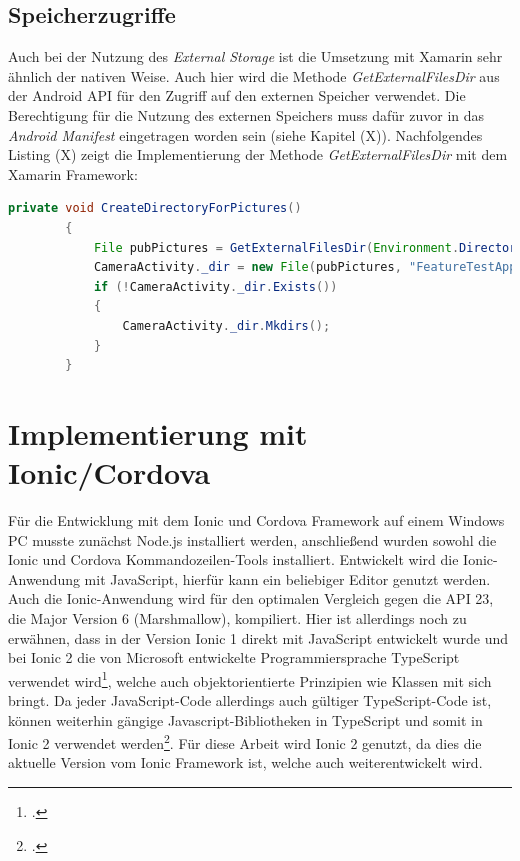 \subsection{Speicherzugriffe}

Auch bei der Nutzung des \textit{External Storage} ist die Umsetzung mit Xamarin sehr ähnlich der nativen Weise. Auch hier wird die Methode \textit{GetExternalFilesDir} aus der Android API für den Zugriff auf den externen Speicher verwendet. Die Berechtigung für die Nutzung des externen Speichers muss dafür zuvor in das \textit{Android Manifest} eingetragen worden sein (siehe Kapitel (X)). Nachfolgendes Listing (X) zeigt die Implementierung der Methode \textit{GetExternalFilesDir} mit dem Xamarin Framework:

\begin{lstlisting}[caption=Methode \textit{GetExternalFilesDir()}: Adressieren des 'External Storage' und Anlegen eines Ordners für die Fotos der Funktionstest-Anwendung, label=lst:SpeicherzugriffXamarin, language=Java]
private void CreateDirectoryForPictures()
        {
            File pubPictures = GetExternalFilesDir(Environment.DirectoryPictures);
            CameraActivity._dir = new File(pubPictures, "FeatureTestAppXamarin");
            if (!CameraActivity._dir.Exists())
            {
                CameraActivity._dir.Mkdirs();
            }
        }
\end{lstlisting}

\section{Implementierung mit Ionic/Cordova}

Für die Entwicklung mit dem Ionic und Cordova Framework auf einem Windows PC musste zunächst Node.js installiert werden, anschließend wurden sowohl die Ionic und Cordova Kommandozeilen-Tools installiert. Entwickelt wird die Ionic-Anwendung mit JavaScript, hierfür kann ein beliebiger Editor genutzt werden. Auch die Ionic-Anwendung wird für den optimalen Vergleich gegen die API 23, die Major Version 6 (Marshmallow), kompiliert. Hier ist allerdings noch zu erwähnen, dass in der Version Ionic 1 direkt mit JavaScript entwickelt wurde und bei Ionic 2 die von Microsoft entwickelte Programmiersprache TypeScript verwendet wird\footcite{Ionic}, welche auch objektorientierte Prinzipien wie Klassen mit sich bringt. Da jeder JavaScript-Code allerdings auch gültiger TypeScript-Code ist, können weiterhin gängige Javascript-Bibliotheken in TypeScript und somit in Ionic 2 verwendet werden\footcite{TypeScript}. Für diese Arbeit wird Ionic 2 genutzt, da dies die aktuelle Version vom Ionic Framework ist, welche auch weiterentwickelt wird.

